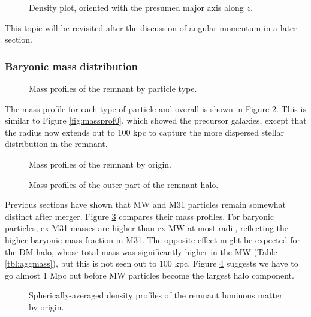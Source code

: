 \documentclass[twocolumn]{aastex63}
\begin{document}
\begin{figure}[htb!]
	\caption{Density plot, oriented with the presumed major axis along $z$.
		\label{fig:rem_tensor}}
\end{figure}

This topic will be revisited after the discussion of angular momentum in a later section.

\subsubsection{Baryonic mass distribution}

\begin{figure}[htb!]
	\caption{Mass profiles of the remnant by particle type.
		\label{fig:rem_mp_type}}
\end{figure}

The mass profile for each type of particle and overall is shown in Figure \ref{fig:rem_mp_type}. This is similar to Figure \ref{fig:massprof0}, which showed the precursor galaxies, except that the radius now extends out to 100 kpc to capture the more dispersed stellar distribution in the remnant.

\begin{figure}[htb!]
	\caption{Mass profiles of the remnant by origin.
	\label{fig:rem_mp_origin}}
\end{figure}

\begin{figure}[htb!]
	\caption{Mass profiles of the outer part of the remnant halo.
		\label{fig:rem_mp_halo}}
\end{figure}

Previous sections have shown that MW and M31 particles remain somewhat distinct after merger. Figure \ref{fig:rem_mp_origin} compares their mass profiles. For baryonic particles, ex-M31 masses are higher than ex-MW at most radii, reflecting the higher baryonic mass fraction in M31. The opposite effect might be expected for the DM halo, whose total mass was significantly higher in the MW (Table \ref{tbl:aggmass}), but this is not seen out to 100 kpc. Figure \ref{fig:rem_mp_halo} suggests we have to go almost 1 Mpc out before MW particles become the largest halo component.

\begin{figure}[htb!]
	\caption{Spherically-averaged density profiles of the remnant luminous matter by origin.
		\label{fig:rem_lum_rho}}
\end{figure}
\end{document}
